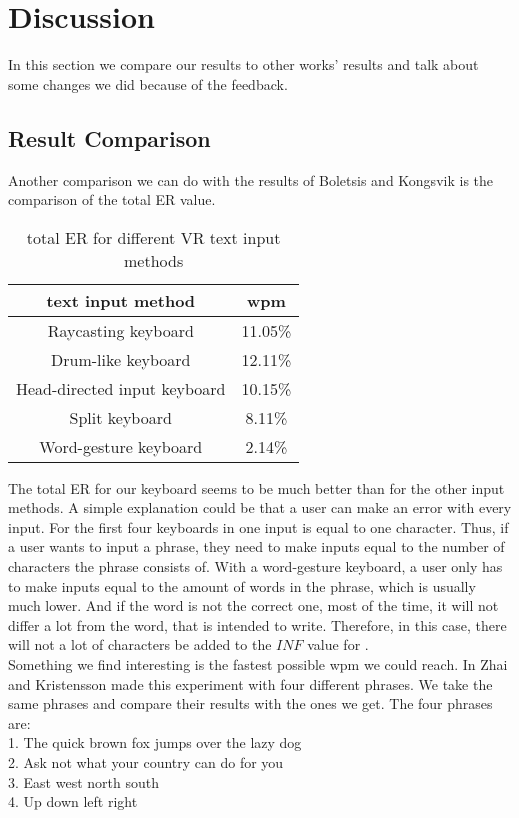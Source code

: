 \section{Discussion}
In this section we compare our results to other works' results and talk about some changes we did because of the feedback.

\subsection{Result Comparison}
Another comparison we can do with the results of Boletsis and Kongsvik \cite{Boletsis2019ControllerbasedTT} is the comparison of the total ER value.
\begin{table}[H]
    \centering
    \caption{total ER for different VR text input methods}
    \begin{tabular}{cc} \toprule
        text input method&wpm\\ \midrule
        Raycasting keyboard& 11.05\%\\
        Drum-like keyboard& 12.11\%\\
        Head-directed input keyboard& 10.15\%\\
        Split keyboard& 8.11\%\\
        Word-gesture keyboard& 2.14\%\\
        \bottomrule
    \end{tabular}
    \label{tab:total_er_compare}
\end{table}
The total ER for our keyboard seems to be much better than for the other input methods. A simple explanation could be that a user can make an error with every input. For the first four keyboards in  one input is equal to one character. Thus, if a user wants to input a phrase, they need to make inputs equal to the number of characters the phrase consists of. With a word-gesture keyboard, a user only has to make inputs equal to the amount of words in the phrase, which is usually much lower. And if the word is not the correct one, most of the time, it will not differ a lot from the word, that is intended to write. Therefore, in this case, there will not a lot of characters be added to the $INF$ value for .\\

Something we find interesting is the fastest possible wpm we could reach. In \cite{Kristensson2004SHARK2AL} Zhai and Kristensson made this experiment with four different phrases. We take the same phrases and compare their results with the ones we get. The four phrases are:\\
1. The quick brown fox jumps over the lazy dog\\
2. Ask not what your country can do for you\\
3. East west north south\\
4. Up down left right\\

